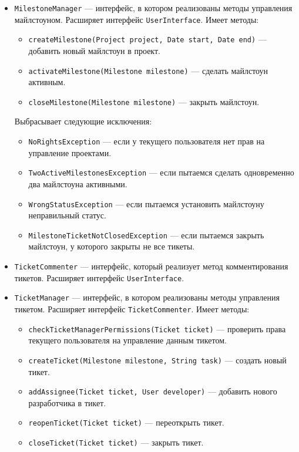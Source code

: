 \begin{itemize}
\item \texttt{MilestoneManager} --- интерфейс, в котором реализованы методы управления майлстоуном. Расширяет интерфейс \texttt{UserInterface}. Имеет методы:
	\begin{itemize}
	\item \texttt{createMilestone(Project project, Date start, Date end)} --- добавить новый майлстоун в проект.
	\item \texttt{activateMilestone(Milestone milestone)} --- сделать майлстоун активным.
	\item \texttt{closeMilestone(Milestone milestone)} --- закрыть майлстоун.	
	\end{itemize}
	
	Выбрасывает следующие исключения:
	\begin{itemize}
	\item \texttt{NoRightsException} --- если у текущего пользователя нет прав на управление проектами.
	\item \texttt{TwoActiveMilestonesException} --- если пытаемся сделать одновременно два майлстоуна активными.
	\item \texttt{WrongStatusException} --- если пытаемся установить майлстоуну неправильный статус.	
	\item \texttt{MilestoneTicketNotClosedException} --- если пытаемся закрыть майлстоун, у которого закрыты не все тикеты.	
	\end{itemize}

\item \texttt{TicketCommenter} --- интерфейс, который реализует метод комментирования тикетов. Расширяет интерфейс \texttt{UserInterface}.
	
\item \texttt{TicketManager} --- интерфейс, в котором реализованы методы управления тикетом. Расширяет интерфейс \texttt{TicketCommenter}. Имеет методы:
	\begin{itemize}
	\item \texttt{checkTicketManagerPermissions(Ticket ticket)} --- проверить права текущего пользователя на управление данным тикетом.
	\item \texttt{createTicket(Milestone milestone, String task)} --- создать новый тикет.
	\item \texttt{addAssignee(Ticket ticket, User developer)} --- добавить нового разработчика в тикет.	
	\item \texttt{reopenTicket(Ticket ticket)} --- переоткрыть тикет.
	\item \texttt{closeTicket(Ticket ticket)} --- закрыть тикет.
	\end{itemize}
	

\end{itemize}
